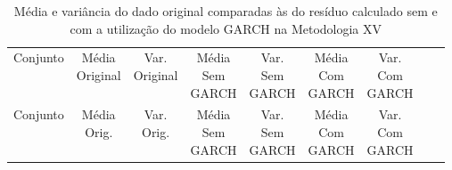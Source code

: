 \clearpage

\begin{center}
\begin{longtable}{ccccccccc}
\toprule
\rowcolor{white}
\caption[Metodologia XV: dados estatísticos]{Média e variância do dado original
comparadas às do resíduo calculado sem e com a utilização do modelo GARCH na
Metodologia XV} \label{tab:DadosEstatisticosMet15}\\
\midrule
    Conjunto & \specialcell{Média\\Original} &
    \specialcell{Var.\\Original} & \specialcell{Média\\Sem\\GARCH} &
    \specialcell{Var.\\Sem\\GARCH} & \specialcell{Média\\Com\\GARCH}&
    \specialcell{Var.\\Com\\GARCH} \\

\midrule
\endfirsthead 
\midrule
\rowcolor{white}
    Conjunto & \specialcell{Média\\Orig.} &
    \specialcell{Var.\\Orig.} & \specialcell{Média\\Sem\\GARCH} &
    \specialcell{Var.\\Sem\\GARCH} & \specialcell{Média\\Com\\GARCH}&
    \specialcell{Var.\\Com\\GARCH} \\


\end{longtable}
\end{center}
